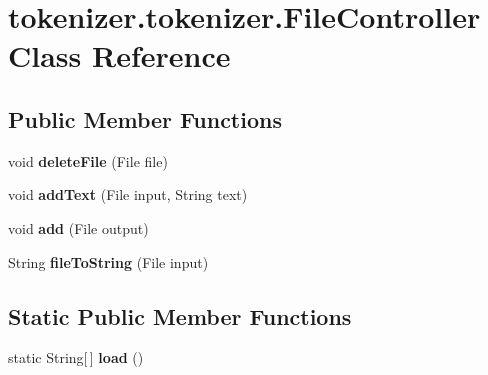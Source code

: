 \hypertarget{classtokenizer_1_1tokenizer_1_1_file_controller}{}\section{tokenizer.\+tokenizer.\+File\+Controller Class Reference}
\label{classtokenizer_1_1tokenizer_1_1_file_controller}
\subsection*{Public Member Functions}
\begin{DoxyCompactItemize}
\item 
\hypertarget{classtokenizer_1_1tokenizer_1_1_file_controller_a390b1263b57bb514699dbf9d11d7c83f}{}void {\bfseries delete\+File} (File file)\label{classtokenizer_1_1tokenizer_1_1_file_controller_a390b1263b57bb514699dbf9d11d7c83f}

\item 
\hypertarget{classtokenizer_1_1tokenizer_1_1_file_controller_a82f8beb57186a72d8f95a7aac8bbd34c}{}void {\bfseries add\+Text} (File input, String text)\label{classtokenizer_1_1tokenizer_1_1_file_controller_a82f8beb57186a72d8f95a7aac8bbd34c}

\item 
\hypertarget{classtokenizer_1_1tokenizer_1_1_file_controller_a6b462a791fe2cfc4754e9f9d084210ff}{}void {\bfseries add} (File output)\label{classtokenizer_1_1tokenizer_1_1_file_controller_a6b462a791fe2cfc4754e9f9d084210ff}

\item 
\hypertarget{classtokenizer_1_1tokenizer_1_1_file_controller_a58d45676902a83d6b319601a134000bd}{}String {\bfseries file\+To\+String} (File input)\label{classtokenizer_1_1tokenizer_1_1_file_controller_a58d45676902a83d6b319601a134000bd}

\end{DoxyCompactItemize}
\subsection*{Static Public Member Functions}
\begin{DoxyCompactItemize}
\item 
\hypertarget{classtokenizer_1_1tokenizer_1_1_file_controller_ac89b0a4919b5d5ea6ce658382ed68a0c}{}static String\mbox{[}$\,$\mbox{]} {\bfseries load} ()\label{classtokenizer_1_1tokenizer_1_1_file_controller_ac89b0a4919b5d5ea6ce658382ed68a0c}

\end{DoxyCompactItemize}
